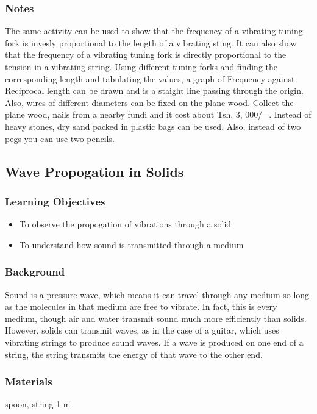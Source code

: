 \subsubsection*{Notes}
The same activity can be used to show that the frequency of a vibrating tuning fork is invesly proportional to the length of a vibrating sting. It can also show that the frequency of a vibrating tuning fork is directly proportional to the tension in a vibrating string. Using different tuning forks and finding the corresponding length and tabulating the values, a graph of Frequency against Reciprocal length can be drawn and is a staight line passing through the origin. Also, wires of different diameters can be fixed on the plane wood. Collect the plane wood, nails from a nearby fundi and it cost about Tsh.  3, 000/=. Instead of heavy stones, dry sand packed in plastic bags can be used. Also, instead of two pegs you can use two pencils.  

\subsection{Wave Propogation in Solids}

\subsubsection*{Learning Objectives}
\begin{itemize}
\item{To observe the propogation of vibrations through a solid}
\item{To understand how sound is transmitted through a medium}
\end{itemize}

\subsubsection*{Background}
Sound is a pressure wave, which means it can travel through any medium so long as the molecules in that medium are free to vibrate.  In fact, this is every medium, though air and water transmit sound much more efficiently than solids.  However, solids can transmit waves, as in the case of a guitar, which uses vibrating strings to produce sound waves.
If a wave is produced on one end of a string, the string transmits the energy of that wave to the other end.

\subsubsection*{Materials}
spoon, string 1 m

